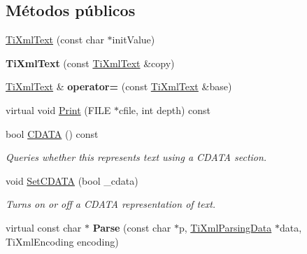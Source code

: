 \subsection*{\-Métodos públicos}
\begin{DoxyCompactItemize}
\item 
\hyperlink{classTiXmlText_af659e77c6b87d684827f35a8f4895960}{\-Ti\-Xml\-Text} (const char $\ast$init\-Value)
\item 
\hypertarget{classTiXmlText_a8d2cc1b4af2208cbb0171cf20f6815d1}{{\bfseries \-Ti\-Xml\-Text} (const \hyperlink{classTiXmlText}{\-Ti\-Xml\-Text} \&copy)}\label{classTiXmlText_a8d2cc1b4af2208cbb0171cf20f6815d1}

\item 
\hypertarget{classTiXmlText_aed5b13f9c1b804c616fd533882c29f57}{\hyperlink{classTiXmlText}{\-Ti\-Xml\-Text} \& {\bfseries operator=} (const \hyperlink{classTiXmlText}{\-Ti\-Xml\-Text} \&base)}\label{classTiXmlText_aed5b13f9c1b804c616fd533882c29f57}

\item 
virtual void \hyperlink{classTiXmlText_ae74d56c5b3ddec6cc3103dd51821af92}{\-Print} (\-F\-I\-L\-E $\ast$cfile, int depth) const 
\item 
\hypertarget{classTiXmlText_ad1a6a6b83fa2271022dd97c072a2b586}{bool \hyperlink{classTiXmlText_ad1a6a6b83fa2271022dd97c072a2b586}{\-C\-D\-A\-T\-A} () const }\label{classTiXmlText_ad1a6a6b83fa2271022dd97c072a2b586}

\begin{DoxyCompactList}\small\item\em \-Queries whether this represents text using a \-C\-D\-A\-T\-A section. \end{DoxyCompactList}\item 
\hypertarget{classTiXmlText_acb17ff7c5d09b2c839393445a3de5ea9}{void \hyperlink{classTiXmlText_acb17ff7c5d09b2c839393445a3de5ea9}{\-Set\-C\-D\-A\-T\-A} (bool \-\_\-cdata)}\label{classTiXmlText_acb17ff7c5d09b2c839393445a3de5ea9}

\begin{DoxyCompactList}\small\item\em \-Turns on or off a \-C\-D\-A\-T\-A representation of text. \end{DoxyCompactList}\item 
\hypertarget{classTiXmlText_a8d2dcfa41fc73d3e62dacc2fcf633819}{virtual const char $\ast$ {\bfseries \-Parse} (const char $\ast$p, \hyperlink{classTiXmlParsingData}{\-Ti\-Xml\-Parsing\-Data} $\ast$data, \-Ti\-Xml\-Encoding encoding)}\label{classTiXmlText_a8d2dcfa41fc73d3e62dacc2fcf633819}


\end{DoxyCompactItemize}
